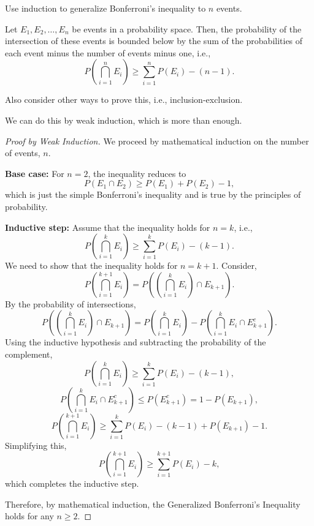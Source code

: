         \begin{exercise}
            Use induction to generalize Bonferroni's inequality to $n$ events.
            \begin{theorem}
                Let \( E_1, E_2, \ldots, E_n \) be events in a probability space. Then, the probability of the intersection of these events is bounded below by the sum of the probabilities of each event minus the number of events minus one, i.e.,
                \[
                P\left(\bigcap_{i=1}^n E_i\right) \geq \sum_{i=1}^n P(E_i) - (n - 1).
                \]
            \end{theorem}
            Also consider other ways to prove this, i.e., inclusion-exclusion.
        \end{exercise}
        We can do this by weak induction, which is more than enough.
        \begin{proof}[Proof by Weak Induction]
            We proceed by mathematical induction on the number of events, \( n \).
            
            \textbf{Base case:} For \( n = 2 \), the inequality reduces to 
            \[
            P(E_1 \cap E_2) \geq P(E_1) + P(E_2) - 1,
            \]
            which is just the simple Bonferroni's inequality and is true by the principles of probability.
            
            \textbf{Inductive step:} Assume that the inequality holds for \( n = k \), i.e.,
            \[
            P\left(\bigcap_{i=1}^k E_i\right) \geq \sum_{i=1}^k P(E_i) - (k - 1).
            \]
            We need to show that the inequality holds for \( n = k+1 \). Consider,
            \[
            P\left(\bigcap_{i=1}^{k+1} E_i\right) = P\left(\left(\bigcap_{i=1}^k E_i\right) \cap E_{k+1}\right).
            \]
            By the probability of intersections,
            \[
            P\left(\left(\bigcap_{i=1}^k E_i\right) \cap E_{k+1}\right) = P\left(\bigcap_{i=1}^k E_i\right) - P\left(\bigcap_{i=1}^k E_i \cap E_{k+1}^c\right).
            \]
            Using the inductive hypothesis and subtracting the probability of the complement,
            \[
            P\left(\bigcap_{i=1}^k E_i\right) \geq \sum_{i=1}^k P(E_i) - (k - 1),
            \]
            \[
            P\left(\bigcap_{i=1}^k E_i \cap E_{k+1}^c\right) \leq P\left(E_{k+1}^c\right) = 1 - P(E_{k+1}),
            \]
            \[
            P\left(\bigcap_{i=1}^{k+1} E_i\right) \geq \sum_{i=1}^k P(E_i) - (k - 1) + P(E_{k+1}) - 1.
            \]
            Simplifying this,
            \[
            P\left(\bigcap_{i=1}^{k+1} E_i\right) \geq \sum_{i=1}^{k+1} P(E_i) - k,
            \]
            which completes the inductive step.
            
            Therefore, by mathematical induction, the Generalized Bonferroni's Inequality holds for any \( n \geq 2 \).
            \end{proof}

